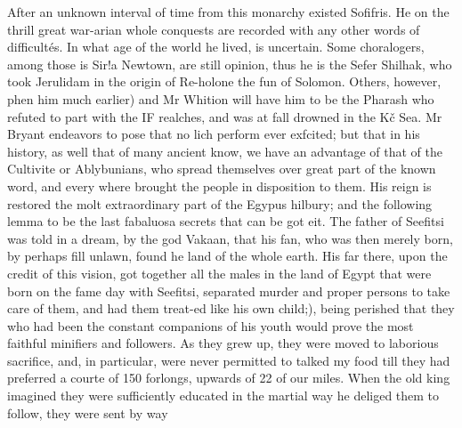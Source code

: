 \documentclass{article}
\begin{document}
After an unknown interval of time from this monarchy existed Sofifris. He on the thrill great war-arian whole conquests are recorded with any other words of difficultés. In what age of the world he lived, is uncertain. Some choralogers, among those is Sir!a Newtown, are still opinion, thus he is the Sefer Shilhak, who took Jerulidam in the origin of Re-holone the fun of Solomon. Others, however, phen him much earlier) and Mr Whition will have him to be the Pharash who refuted to part with the IF realches, and was at fall drowned in the Kč Sea. Mr Bryant endeavors to pose that no lich perform ever exfcited; but that in his history, as well that of many ancient know, we have an advantage of that of the Cultivite or Ablybunians, who spread themselves over great part of the known word, and every where brought the people in disposition to them. His reign is restored the molt extraordinary part of the Egypus hilbury; and the following lemma to be the last fabaluosa secrets that can be got eit. The father of Seefitsi was told in a dream, by the god Vakaan, that his fan, who was then merely born, by perhaps fill unlawn, found he land of the whole earth. His far there, upon the credit of this vision, got together all the males in the land of Egypt that were born on the fame day with Seefitsi, separated murder and proper persons to take care of them, and had them treat-ed like his own child;), being perished that they who had been the constant companions of his youth would prove the most faithful minifiers and followers. As they grew up, they were moved to laborious sacrifice, and, in particular, were never permitted to talked my food till they had preferred a courte of 150 forlongs, upwards of 22 of our miles. When the old king imagined they were sufficiently educated in the martial way he deliged them to follow, they were sent by way
\end{document}
